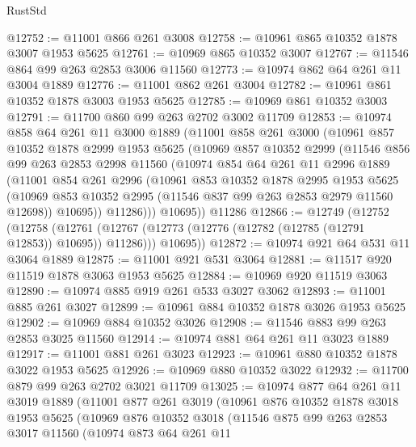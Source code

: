 \begin{lexlean}{RustStd}
\begin{coremodule}
@12752 := @11001 @866 @261 @3008
@12758 := @10961 @865 @10352 @1878 @3007 @1953 @5625
@12761 := @10969 @865 @10352 @3007
@12767 := @11546 @864 @99 @263 @2853 @3006 @11560
@12773 := @10974 @862 @64 @261 @11 @3004 @1889
@12776 := @11001 @862 @261 @3004
@12782 := @10961 @861 @10352 @1878 @3003 @1953 @5625
@12785 := @10969 @861 @10352 @3003
@12791 := @11700 @860 @99 @263 @2702 @3002 @11709
@12853 := @10974
    @858
    @64
    @261
    @11
    @3000
    @1889
    (@11001
      @858
      @261
      @3000
      (@10961
        @857
        @10352
        @1878
        @2999
        @1953
        @5625
        (@10969
          @857
          @10352
          @2999
          (@11546
            @856
            @99
            @263
            @2853
            @2998
            @11560
            (@10974
              @854
              @64
              @261
              @11
              @2996
              @1889
              (@11001
                @854
                @261
                @2996
                (@10961
                  @853
                  @10352
                  @1878
                  @2995
                  @1953
                  @5625
                  (@10969 @853 @10352 @2995 (@11546 @837 @99 @263 @2853 @2979 @11560 @12698))
                  @10695))
              @11286)))
        @10695))
    @11286
@12866 := @12749
    (@12752
      (@12758
        (@12761 (@12767 (@12773 (@12776 (@12782 (@12785 (@12791 @12853)) @10695)) @11286)))
        @10695))
@12872 := @10974 @921 @64 @531 @11 @3064 @1889
@12875 := @11001 @921 @531 @3064
@12881 := @11517 @920 @11519 @1878 @3063 @1953 @5625
@12884 := @10969 @920 @11519 @3063
@12890 := @10974 @885 @919 @261 @533 @3027 @3062
@12893 := @11001 @885 @261 @3027
@12899 := @10961 @884 @10352 @1878 @3026 @1953 @5625
@12902 := @10969 @884 @10352 @3026
@12908 := @11546 @883 @99 @263 @2853 @3025 @11560
@12914 := @10974 @881 @64 @261 @11 @3023 @1889
@12917 := @11001 @881 @261 @3023
@12923 := @10961 @880 @10352 @1878 @3022 @1953 @5625
@12926 := @10969 @880 @10352 @3022
@12932 := @11700 @879 @99 @263 @2702 @3021 @11709
@13025 := @10974
    @877
    @64
    @261
    @11
    @3019
    @1889
    (@11001
      @877
      @261
      @3019
      (@10961
        @876
        @10352
        @1878
        @3018
        @1953
        @5625
        (@10969
          @876
          @10352
          @3018
          (@11546
            @875
            @99
            @263
            @2853
            @3017
            @11560
            (@10974
              @873
              @64
              @261
              @11

\end{coremodule}
\end{lexlean}
